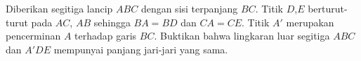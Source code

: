 Diberikan segitiga lancip $ABC$ dengan sisi terpanjang $BC$. Titik $D$,$E$ berturut-turut pada $AC$, $AB$ sehingga $BA=BD$ dan $CA=CE$. Titik $A'$ merupakan pencerminan $A$ terhadap garis $BC$. Buktikan bahwa lingkaran luar segitiga $ABC$ dan $A'DE$ mempunyai panjang jari-jari yang sama.